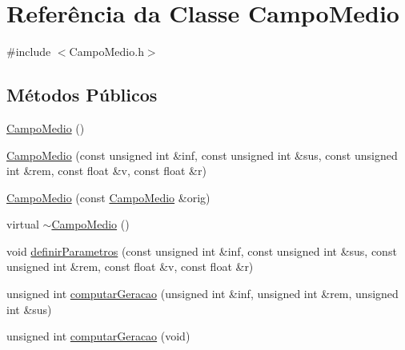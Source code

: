 \hypertarget{class_campo_medio}{
\section{Referência da Classe CampoMedio}
\label{class_campo_medio}
}


{\ttfamily \#include $<$CampoMedio.h$>$}

\subsection*{Métodos Públicos}
\begin{DoxyCompactItemize}
\item 
\hyperlink{class_campo_medio_aa347350dc7400ea972e6d68697f7a255}{CampoMedio} ()
\item 
\hyperlink{class_campo_medio_a26486000d6e1ac2d45deb27b83298f75}{CampoMedio} (const unsigned int \&inf, const unsigned int \&sus, const unsigned int \&rem, const float \&v, const float \&r)
\item 
\hyperlink{class_campo_medio_a1a6953b3ac67f7bfabd50740ecf745be}{CampoMedio} (const \hyperlink{class_campo_medio}{CampoMedio} \&orig)
\item 
virtual \hyperlink{class_campo_medio_acc4b65a3895a2d1ca5ec9599f2169724}{$\sim$CampoMedio} ()
\item 
void \hyperlink{class_campo_medio_a5dd007336e207d53fe640e04f65f2817}{definirParametros} (const unsigned int \&inf, const unsigned int \&sus, const unsigned int \&rem, const float \&v, const float \&r)
\item 
unsigned int \hyperlink{class_campo_medio_a706f255554ae3507b37c750c0e59a12a}{computarGeracao} (unsigned int \&inf, unsigned int \&rem, unsigned int \&sus)
\item 
unsigned int \hyperlink{class_campo_medio_a9f90c6abc6920d153627560eccef85fc}{computarGeracao} (void)
\end{DoxyCompactItemize}


